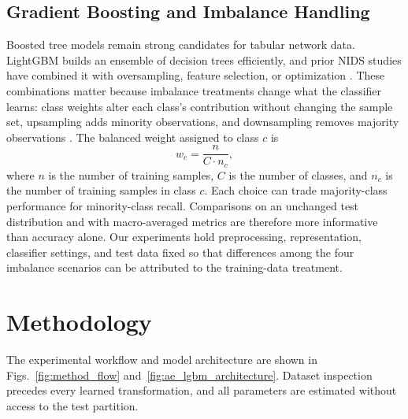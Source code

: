 \documentclass[conference]{IEEEtran}
\begin{document}
\subsection{Gradient Boosting and Imbalance Handling}
Boosted tree models remain strong candidates for tabular network data. LightGBM builds an ensemble of decision trees efficiently, and prior NIDS studies have combined it with oversampling, feature selection, or optimization \cite{Liu2021LightGBM,Munawar2025,Wakili2025,Kouassi2025}. These combinations matter because imbalance treatments change what the classifier learns: class weights alter each class's contribution without changing the sample set, upsampling adds minority observations, and downsampling removes majority observations \cite{Ma2025FSLLM,Wakili2025}. The balanced weight assigned to class $c$ is
\begin{equation}
w_c = \frac{n}{C \cdot n_c},
\label{eq:class_weight}
\end{equation}
where $n$ is the number of training samples, $C$ is the number of classes, and $n_c$ is the number of training samples in class $c$. Each choice can trade majority-class performance for minority-class recall. Comparisons on an unchanged test distribution and with macro-averaged metrics are therefore more informative than accuracy alone. Our experiments hold preprocessing, representation, classifier settings, and test data fixed so that differences among the four imbalance scenarios can be attributed to the training-data treatment.

\section{Methodology}
The experimental workflow and model architecture are shown in Figs.~\ref{fig:method_flow} and~\ref{fig:ae_lgbm_architecture}. Dataset inspection precedes every learned transformation, and all parameters are estimated without access to the test partition.
\end{document}
